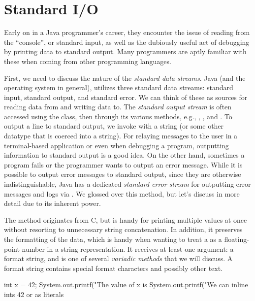 \section{Standard I/O}
Early on in a Java programmer's career, they encounter the issue of reading from the ``console'', or standard input, as well as the dubiously useful act of debugging by printing data to standard output. Many programmers are aptly familiar with these when coming from other programming languages.

First, we need to discuss the nature of the \textit{standard data streams}. Java (and the operating system in general), utilizes three standard data streams: standard input, standard output, and standard error. We can think of these as sources for reading data from and writing data to. The \textit{standard output stream} is often accessed using the  class, then through its various methods, e.g., , , and . To output a line to standard output, we invoke  with a string (or some other datatype that is coerced into a string). For relaying messages to the user in a terminal-based application or even when debugging a program, outputting information to standard output is a good idea. On the other hand, sometimes a program fails or the programmer wants to output an error message. While it is possible to output error messages to standard output, since they are otherwise indistinguishable, Java has a dedicated \textit{standard error stream} for outputting error messages and logs via . We glossed over this method, but let's discuss  in more detail due to its inherent power.

The  method originates from C, but is handy for printing multiple values at once without resorting to unnecessary string concatenation. In addition, it preserves the formatting of the data, which is handy when wanting to treat a  as a floating-point number in a string representation. It receives at least one argument: a format string, and is one of several \textit{variadic methods} that we will discuss. A format string contains special format characters and possibly other text. 

\begin{verbnobox}[\footnotesize]
int x = 42;
System.out.printf("The value of x is %
System.out.printf("We can inline ints 42 or as literals %
\end{verbnobox}

